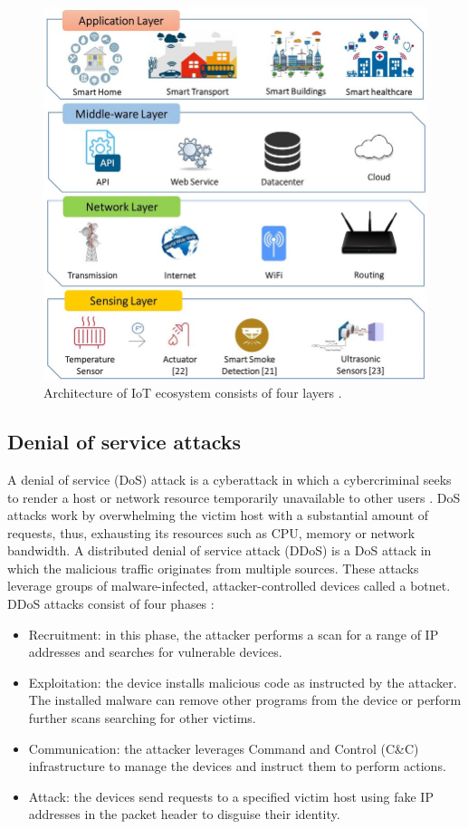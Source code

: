 \documentclass[conference, 11pt]{IEEEtran}
\begin{document}
    \begin{figure}[htbp]
        \centerline{\includegraphics[width=\linewidth]{figures/iot-architecture.jpg}}
        \caption{Architecture of IoT ecosystem consists of four layers \cite{article:9}.}
        \label{fig:iota}
    \end{figure}

    \subsection{Denial of service attacks}
    A denial of service (DoS) attack is a cyberattack in which a cybercriminal seeks to render a host or network resource temporarily unavailable to other users \cite{article:8}.
    DoS attacks work by overwhelming the victim host with a substantial amount of requests, thus, exhausting its resources such as CPU, memory or network bandwidth.
    A distributed denial of service attack (DDoS) is a DoS attack in which the malicious traffic originates from multiple sources.
    These attacks leverage groups of malware-infected, attacker-controlled devices called a botnet.
    DDoS attacks consist of four phases \cite{article:8}:
    \begin{itemize}
        \item Recruitment: in this phase, the attacker performs a scan for a range of IP addresses and searches for vulnerable devices.
        \item Exploitation: the device installs malicious code as instructed by the attacker.
        The installed malware can remove other programs from the device or perform further scans searching for other victims.
        \item Communication: the attacker leverages Command and Control (C\&C) infrastructure to manage the devices and instruct them to perform actions.
        \item Attack: the devices send requests to a specified victim host using fake IP addresses in the packet header to disguise their identity.
    \end{itemize}
\end{document}
